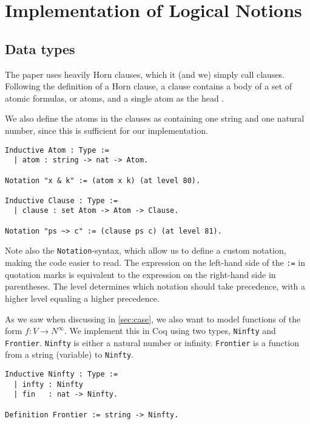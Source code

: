 \chapter{Implementation of Logical Notions}

\section{Data types}

The paper \cite{mbezem} uses heavily Horn clauses, which it (and we) simply call clauses.
Following the definition of a Horn clause, a clause contains a body of a set of atomic formulas,
or atoms, and a single atom as the head \cite{halbert}.

We also define the atoms in the clauses as containing one string and one natural number,
since this is sufficient for our implementation.

\begin{minipage}{\linewidth}
\begin{lstlisting}[language=Coq, label={lst:atom_clause_def}, caption={\lstinline{Atom} and \lstinline{Clause} in Coq}]
Inductive Atom : Type :=
  | atom : string -> nat -> Atom.

Notation "x & k" := (atom x k) (at level 80).

Inductive Clause : Type :=
  | clause : set Atom -> Atom -> Clause.

Notation "ps ~> c" := (clause ps c) (at level 81).
\end{lstlisting}
\end{minipage}

Note also the \lstinline{Notation}-syntax, which allow us to define a custom notation,
making the code easier to read. The expression on the left-hand side of the \lstinline{:=} in quotation marks
is equivalent to the expression on the right-hand side in parentheses.
The level determines which notation should take precedence, with a higher level equaling a higher precedence.

As we saw when discussing \cite{mbezem} in \autoref{sec:case},
we also want to model functions of the form $f : V \rightarrow N^{\infty}$.
We implement this in Coq using two types, \lstinline{Ninfty} and \lstinline{Frontier}.
\lstinline{Ninfty} is either a natural number or infinity.
\lstinline{Frontier} is a function from a string (variable) to \lstinline{Ninfty}.

\begin{minipage}{\linewidth}
\begin{lstlisting}[language=Coq, label={lst:ninfty_frontier_def}, caption={\lstinline{Ninfty} and \lstinline{Frontier} in Coq}]
Inductive Ninfty : Type :=
  | infty : Ninfty
  | fin   : nat -> Ninfty.

Definition Frontier := string -> Ninfty.
\end{lstlisting}
\end{minipage}

